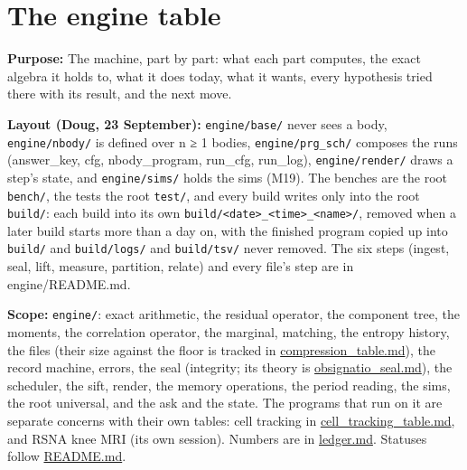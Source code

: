 \chapter{\texorpdfstring{The engine table}{The engine table}}
\label{chap:engine-table}

\textbf{Purpose:} The machine, part by part: what each part computes, the exact algebra it holds to, what it does today, what it wants, every hypothesis tried there with its result, and the next move.

\textbf{Layout (Doug, 23 September):} \texttt{engine/\allowbreak{}base/\allowbreak{}} never sees a body, \texttt{engine/\allowbreak{}nbody/\allowbreak{}} is defined over n ≥ 1 bodies, \texttt{engine/\allowbreak{}prg\_\allowbreak{}sch/\allowbreak{}} composes the runs (answer\_\allowbreak{}key, cfg, nbody\_\allowbreak{}program, run\_\allowbreak{}cfg, run\_\allowbreak{}log), \texttt{engine/\allowbreak{}render/\allowbreak{}} draws a step's state, and \texttt{engine/\allowbreak{}sims/\allowbreak{}} holds the sims (M19). The benches are the root \texttt{bench/\allowbreak{}}, the tests the root \texttt{test/\allowbreak{}}, and every build writes only into the root \texttt{build/\allowbreak{}}: each build into its own \texttt{build/\allowbreak{}<date>\_\allowbreak{}<time>\_\allowbreak{}<name>/\allowbreak{}}, removed when a later build starts more than a day on, with the finished program copied up into \texttt{build/\allowbreak{}} and \texttt{build/\allowbreak{}logs/\allowbreak{}} and \texttt{build/\allowbreak{}tsv/\allowbreak{}} never removed. The six steps (ingest, seal, lift, measure, partition, relate) and every file's step are in engine/README.md.

\textbf{Scope:} \texttt{engine/\allowbreak{}}: exact arithmetic, the residual operator, the component tree, the moments, the correlation operator, the marginal, matching, the entropy history, the files (their size against the floor is tracked in \hyperref[chap:compression-table]{compression\_\allowbreak{}table.md}), the record machine, errors, the seal (integrity; its theory is \hyperref[chap:obsignatio-seal]{obsignatio\_\allowbreak{}seal.md}), the scheduler, the sift, render, the memory operations, the period reading, the sims, the root universal, and the ask and the state. The programs that run on it are separate concerns with their own tables: cell tracking in \hyperref[chap:cell-tracking-table]{cell\_\allowbreak{}tracking\_\allowbreak{}table.md}, and RSNA knee MRI (its own session). Numbers are in \hyperref[chap:ledger]{ledger.md}. Statuses follow \hyperref[chap:readme]{README.md}.

